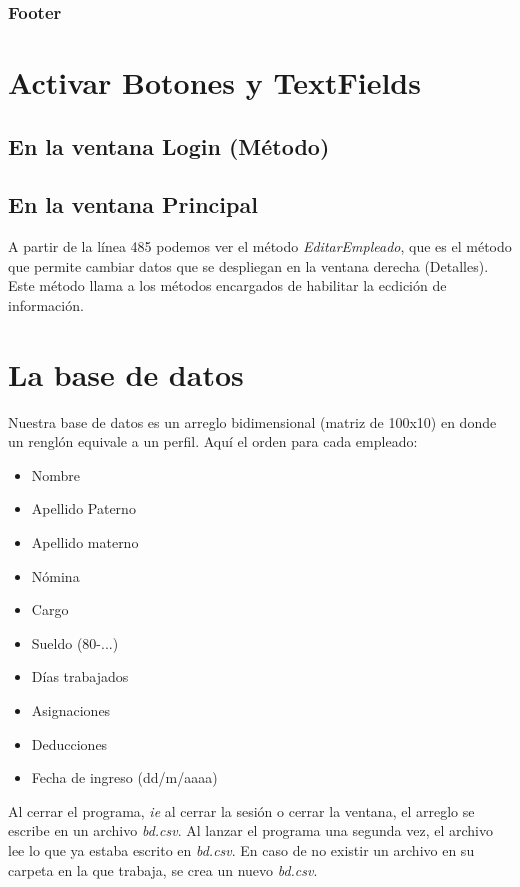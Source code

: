 \documentclass[12pt]{article}
\begin{document}
\subsubsection{Footer}



\section{Activar Botones y TextFields}

\subsection{En la ventana Login (M\'etodo)}


\subsection{En la ventana Principal}
{A partir de la l\'inea 485 podemos ver el m\'etodo \textit{EditarEmpleado}, que es el m\'etodo que permite cambiar datos que se despliegan en la ventana derecha (Detalles).}\\
{Este m\'etodo llama a los m\'etodos encargados de habilitar la ecdici\'on de informaci\'on.}

\section{La base de datos}
{Nuestra base de datos es un arreglo bidimensional (matriz de 100x10) en donde un rengl\'on equivale a un perfil. Aqu\'i el orden para cada empleado:}
\begin{itemize}
\item Nombre
\item Apellido Paterno
\item Apellido materno
\item N\'omina
\item Cargo
\item Sueldo (80-...)
\item D\'ias trabajados
\item Asignaciones
\item Deducciones
\item Fecha de ingreso (dd/m/aaaa)
\end{itemize}
{Al cerrar el programa, \textit{ie} al cerrar la sesi\'on o cerrar la ventana, el arreglo se escribe en un archivo \textit{bd.csv}. Al lanzar el programa una segunda vez, el archivo lee lo que ya estaba escrito en \textit{bd.csv}. En caso de no existir un archivo en su carpeta en la que trabaja, se crea un nuevo \textit{bd.csv}.}
\end{document}
